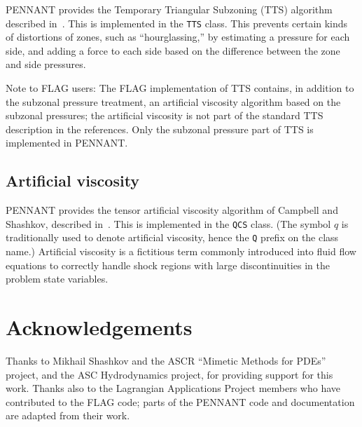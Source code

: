 \documentclass[11pt,letterpaper]{article} %
\begin{document}
PENNANT provides the Temporary Triangular Subzoning (TTS) algorithm
described in~\cite{szp,tts}.  This is implemented in the {\tt TTS}
class.  This prevents certain kinds of distortions of zones, such as
``hourglassing,'' by estimating a pressure for each side, and adding
a force to each side based on the difference
between the zone and side pressures.

Note to FLAG users:  The FLAG implementation of TTS contains, in addition
to the subzonal pressure treatment, an artificial viscosity algorithm
based on the subzonal pressures; the artificial viscosity is not part of
the standard TTS description in the references.  Only the subzonal pressure
part of TTS is implemented in PENNANT.


\subsection{Artificial viscosity}

PENNANT provides the tensor artificial viscosity algorithm of Campbell and
Shashkov, described in~\cite{qcs}.  This is implemented in the {\tt QCS}
class.  (The symbol $q$ is traditionally used to denote artificial
viscosity, hence the {\tt Q} prefix on the class name.)
Artificial viscosity is a fictitious term commonly introduced into
fluid flow equations to correctly handle
shock regions with large discontinuities in
the problem state variables.


\section*{Acknowledgements}

Thanks to Mikhail Shashkov and the ASCR ``Mimetic Methods for PDEs''
project, and the ASC Hydrodynamics project, for providing support for
this work.
Thanks also to the Lagrangian Applications Project members who have
contributed to the FLAG code; parts of the PENNANT code and documentation
are adapted from their work.
\end{document}
